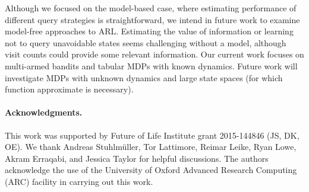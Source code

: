 \documentclass{article}
\begin{document}
Although we focused on the model-based case, where estimating performance of different query strategies is straightforward, we intend in future work to examine model-free approaches to ARL. 
Estimating the value of information or learning not to query unavoidable states seems challenging without a model, although visit counts could provide some relevant information.
Our current work focuses on multi-armed bandits and tabular MDPs with known dynamics.
Future work will investigate MDPs with unknown dynamics and large state spaces (for which function approximate is necessary). 

\paragraph{Acknowledgments.}
This work was supported by Future of Life Institute grant 2015-144846 (JS, DK, OE). 
We thank Andreas Stuhlm\"uller, Tor Lattimore, Reimar Leike, Ryan Lowe, Akram Erraqabi, and Jessica Taylor for helpful discussions.
The authors acknowledge the use of the University of Oxford Advanced Research Computing (ARC) facility in carrying out this work. %

\FloatBarrier

\end{document}
